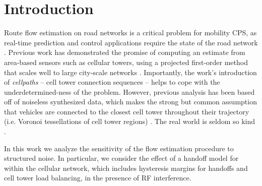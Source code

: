 
\section{Introduction}
Route flow estimation on road networks is a critical problem for mobility CPS, as real-time prediction and control applications require the state of the road network \cite{Faouzi2011,Mathew2014}. Previous work has demonstrated the promise of computing an estimate from area-based sensors such as cellular towers, using a projected first-order method that scales well to large city-scale networks \cite{Wu2015}. Importantly, the work's introduction of \textit{cellpaths} -- cell tower connection sequences -- helps to cope with the underdetermined-ness of the problem. However, previous analysis has been based off of noiseless synthesized data, which makes the strong but common assumption that vehicles are connected to the closest cell tower throughout their trajectory (i.e. Voronoi tessellations of cell tower regions) \cite{Voronoi1908}. The real world is seldom so kind \cite{Caceres2012a,Kieslich2013}.

In this work we analyze the sensitivity of the flow estimation procedure to structured noise. In particular, we consider the effect of a handoff model for within the cellular network, which includes hysteresis margins for handoffs and cell tower load balancing, in the presence of RF interference.
